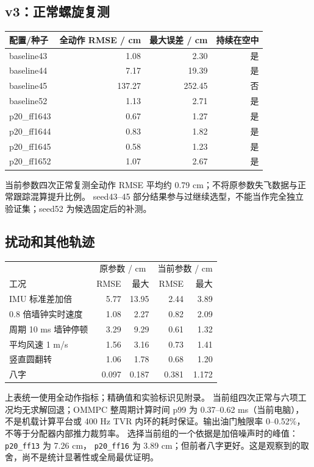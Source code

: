 \documentclass[UTF8,a4paper,11pt,fontset=fandol]{ctexart}
\newcommand{\code}[1]{{\small\nolinkurl{#1}}}
\begin{document}
\subsection{v3：正常螺旋复测}
\begin{center}\begin{tabular}{lrrr}\toprule
配置/种子 & 全动作 RMSE / cm & 最大误差 / cm & 持续在空中\\\midrule
baseline43 & 1.08 & 2.30 & 是\\
baseline44 & 7.17 & 19.39 & 是\\
baseline45 & 137.27 & 252.45 & 否\\
baseline52 & 1.13 & 2.71 & 是\\
p20\_ff1643 & 0.67 & 1.27 & 是\\
p20\_ff1644 & 0.83 & 1.82 & 是\\
p20\_ff1645 & 0.58 & 1.23 & 是\\
p20\_ff1652 & 1.07 & 2.67 & 是\\\bottomrule
\end{tabular}\end{center}
当前参数四次正常复测全动作 RMSE 平均约 0.79 cm；不将原参数失飞数据与正常跟踪混算提升比例。
seed43--45 部分结果参与过继续选型，不能当作完全独立验证集；seed52 为候选固定后的补测。

\subsection{扰动和其他轨迹}
\begin{center}\begin{tabular}{lrrrr}\toprule
& \multicolumn{2}{c}{原参数 / cm} & \multicolumn{2}{c}{当前参数 / cm}\\
工况 & RMSE & 最大 & RMSE & 最大\\\midrule
IMU 标准差加倍 & 5.77 & 13.95 & 2.44 & 3.89\\
0.8 倍墙钟实时速度 & 1.08 & 2.27 & 0.82 & 2.09\\
周期 10 ms 墙钟停顿 & 3.29 & 9.29 & 0.61 & 1.32\\
平均风速 1 m/s & 1.56 & 3.16 & 0.73 & 1.41\\
竖直圆翻转 & 1.06 & 1.78 & 0.68 & 1.20\\
八字 & 0.097 & 0.187 & 0.381 & 1.172\\\bottomrule
\end{tabular}\end{center}
上表统一使用全动作指标；精确值和实验标识见附录。
当前组四次正常与六项工况均无求解回退；OMMPC 整周期计算时间 p99 为 0.37--0.62 ms（当前电脑），
不是机载计算平台或 400 Hz TVR 内环的耗时保证。输出油门触限率 0--0.52\%，不等于分配器内部推力裁剪率。
选择当前组的一个依据是加倍噪声时的峰值：\code{p20_ff13} 为 7.26 cm，
\code{p20_ff16} 为 3.89 cm；但前者八字更好。这是观察到的取舍，尚不是统计显著性或全局最优证明。
\end{document}
